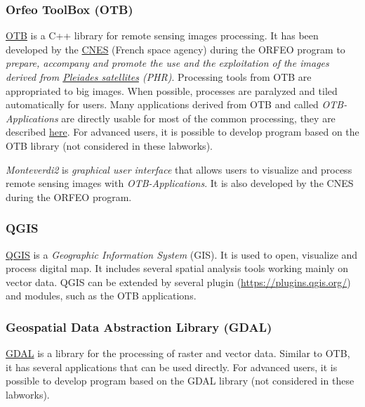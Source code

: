 \documentclass[a4paper,11pt,DIV=18]{scrartcl}
\begin{document}
\subsubsection{Orfeo ToolBox (OTB)}
\label{sec:org4908faa}
\href{https://www.orfeo-toolbox.org/}{OTB} is a C++ library for remote sensing images processing. It has been
developed by the  \href{https://cnes.fr/en}{CNES} (French space agency) during  the ORFEO program
to \emph{prepare, accompany and promote the use and the exploitation of the
images derived from \href{https://en.wikipedia.org/wiki/Pleiades\_\%28satellite\%29}{Pleiades satellites} (PHR)}.  Processing tools from
OTB  are appropriated  to big  images.  When  possible, processes  are
paralyzed and tiled automatically for users. Many applications derived
from OTB and  called \emph{OTB-Applications} are directly usable  for most of
the common processing, they are described \href{https://www.orfeo-toolbox.org/CookBook/CookBook.html}{here}. For advanced users, it
is  possible  to  develop  program  based  on  the  OTB  library  (not
considered in these labworks).

\emph{Monteverdi2} is \emph{graphical user interface} that allows users to visualize
and process  remote sensing images  with \emph{OTB-Applications}. It  is also
developed by the CNES during the ORFEO program. 

\subsubsection{QGIS}
\label{sec:org2b512fd}
\href{http://www.qgis.org/en/site/}{QGIS} is  a \emph{Geographic Information System}  (GIS).  It is used  to open,
visualize  and  process  digital  map.  It  includes  several  spatial
analysis tools working mainly on vector  data. QGIS can be extended by
several plugin  (\url{https://plugins.qgis.org/}) and  modules, such  as the
OTB applications.

\subsubsection{Geospatial Data Abstraction Library (GDAL)}
\label{sec:org78dc388}
\href{http://www.gdal.org/}{GDAL}  is   a  library  for   the  processing  of  raster   and  vector
data. Similar  to OTB, it  has several  applications that can  be used
directly. For advanced users, it  is possible to develop program based
on the GDAL library (not considered in these labworks).
\end{document}
